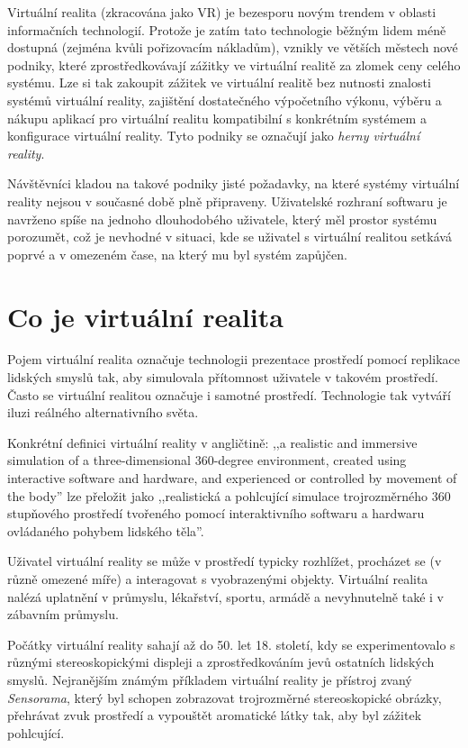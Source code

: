 Virtuální realita (zkracována jako VR) je bezesporu novým trendem v
oblasti informačních technologií. Protože je zatím tato technologie běžným
lidem méně dostupná (zejména kvůli pořizovacím nákladům), vznikly ve větších městech nové podniky, které
zprostředkovávají zážitky ve virtuální realitě za zlomek ceny celého
systému. Lze si tak zakoupit zážitek ve virtuální realitě bez nutnosti znalosti systémů virtuální reality, zajištění
dostatečného výpočetního výkonu, výběru a nákupu aplikací pro virtuální
realitu kompatibilní s konkrétním systémem a konfigurace virtuální reality. Tyto podniky se označují jako \emph{herny virtuální reality}. \autocite{herny}

Návštěvníci kladou na takové podniky jisté požadavky, na které
systémy virtuální reality nejsou v současné době plně připraveny.
Uživatelské rozhraní softwaru je navrženo spíše na jednoho dlouhodobého
uživatele, který měl prostor systému porozumět, což je nevhodné v
situaci, kde se uživatel s virtuální realitou setkává poprvé a v
omezeném čase, na který mu byl systém zapůjčen.

\section{Co je virtuální
realita}\label{co-je-virtuuxe1lnuxed-realita}

Pojem virtuální realita označuje technologii prezentace prostředí pomocí
replikace lidských smyslů tak, aby simulovala přítomnost uživatele v
takovém prostředí. Často se virtuální realitou označuje i samotné
prostředí. Technologie tak vytváří iluzi reálného alternativního světa. \autocite{ovr}

Konkrétní definici virtuální reality v angličtině: ,,a realistic and
immersive simulation of a three-dimensional 360-degree environment,
created using interactive software and hardware, and experienced or
controlled by movement of the body'' \autocite{vrdef} lze přeložit jako ,,realistická a
pohlcující simulace trojrozměrného 360 stupňového prostředí tvořeného
pomocí interaktivního softwaru a hardwaru ovládaného pohybem lidského
těla''.

Uživatel virtuální reality se může v prostředí typicky rozhlížet,
procházet se (v různě omezené míře) a interagovat s vyobrazenými
objekty. Virtuální realita nalézá uplatnění v průmyslu, lékařství,
sportu, armádě a nevyhnutelně také i v zábavním průmyslu. \autocite{vrusage}

Počátky virtuální reality sahají až do 50. let 18. století, kdy se
experimentovalo s různými stereoskopickými displeji a zprostředkováním
jevů ostatních lidských smyslů. Nejranějším známým příkladem virtuální
reality je přístroj zvaný \emph{Sensorama}, který byl schopen zobrazovat
trojrozměrné stereoskopické obrázky, přehrávat zvuk prostředí a
vypouštět aromatické látky tak, aby byl zážitek pohlcující. \autocite{oldvr}

